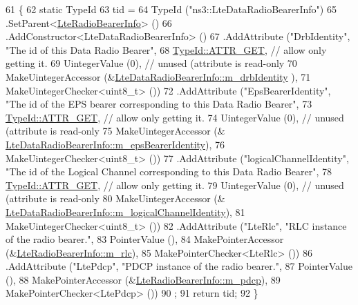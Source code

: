 \begin{DoxyCode}
61 \{
62   \textcolor{keyword}{static} TypeId
63     tid =
64     TypeId (\textcolor{stringliteral}{"ns3::LteDataRadioBearerInfo"})
65     .SetParent<\hyperlink{classns3_1_1LteRadioBearerInfo_af7d2d8620b6ca7aad9e9d24ae2890621}{LteRadioBearerInfo}> ()
66     .AddConstructor<LteDataRadioBearerInfo> ()
67     .AddAttribute (\textcolor{stringliteral}{"DrbIdentity"}, \textcolor{stringliteral}{"The id of this Data Radio Bearer"},
68                    \hyperlink{classns3_1_1TypeId_a3ab7b43b95f96391c514d609ca60e542a3dd4b476c9b257285c177d6c414b5fd0}{TypeId::ATTR\_GET}, \textcolor{comment}{// allow only getting it.}
69                    UintegerValue (0), \textcolor{comment}{// unused (attribute is read-only}
70                    MakeUintegerAccessor (&\hyperlink{classns3_1_1LteDataRadioBearerInfo_a1f5a7e5404b41179c7519e6bbb168de1}{LteDataRadioBearerInfo::m\_drbIdentity}
      ),
71                    MakeUintegerChecker<uint8\_t> ())
72     .AddAttribute (\textcolor{stringliteral}{"EpsBearerIdentity"}, \textcolor{stringliteral}{"The id of the EPS bearer corresponding to this Data Radio Bearer"},
73                    \hyperlink{classns3_1_1TypeId_a3ab7b43b95f96391c514d609ca60e542a3dd4b476c9b257285c177d6c414b5fd0}{TypeId::ATTR\_GET}, \textcolor{comment}{// allow only getting it.}
74                    UintegerValue (0), \textcolor{comment}{// unused (attribute is read-only}
75                    MakeUintegerAccessor (&
      \hyperlink{classns3_1_1LteDataRadioBearerInfo_ac5ff2de272b88aab06d6a1c34955bc0e}{LteDataRadioBearerInfo::m\_epsBearerIdentity}),
76                    MakeUintegerChecker<uint8\_t> ())
77     .AddAttribute (\textcolor{stringliteral}{"logicalChannelIdentity"}, \textcolor{stringliteral}{"The id of the Logical Channel corresponding to this Data
       Radio Bearer"},
78                    \hyperlink{classns3_1_1TypeId_a3ab7b43b95f96391c514d609ca60e542a3dd4b476c9b257285c177d6c414b5fd0}{TypeId::ATTR\_GET}, \textcolor{comment}{// allow only getting it.}
79                    UintegerValue (0), \textcolor{comment}{// unused (attribute is read-only}
80                    MakeUintegerAccessor (&
      \hyperlink{classns3_1_1LteDataRadioBearerInfo_a53a3b4d3b2eeda6e22c32d42163ae558}{LteDataRadioBearerInfo::m\_logicalChannelIdentity}),
81                    MakeUintegerChecker<uint8\_t> ())
82     .AddAttribute (\textcolor{stringliteral}{"LteRlc"}, \textcolor{stringliteral}{"RLC instance of the radio bearer."},
83                    PointerValue (),
84                    MakePointerAccessor (&\hyperlink{classns3_1_1LteRadioBearerInfo_a352622b4fc23346ebfbfc72a0c118eab}{LteRadioBearerInfo::m\_rlc}),
85                    MakePointerChecker<LteRlc> ())
86     .AddAttribute (\textcolor{stringliteral}{"LtePdcp"}, \textcolor{stringliteral}{"PDCP instance of the radio bearer."},
87                    PointerValue (),
88                    MakePointerAccessor (&\hyperlink{classns3_1_1LteRadioBearerInfo_a41199c2413750dd1c29b8b4d362633df}{LteRadioBearerInfo::m\_pdcp}),
89                    MakePointerChecker<LtePdcp> ())
90     ;
91   \textcolor{keywordflow}{return} tid;
92 \}
\end{DoxyCode}


